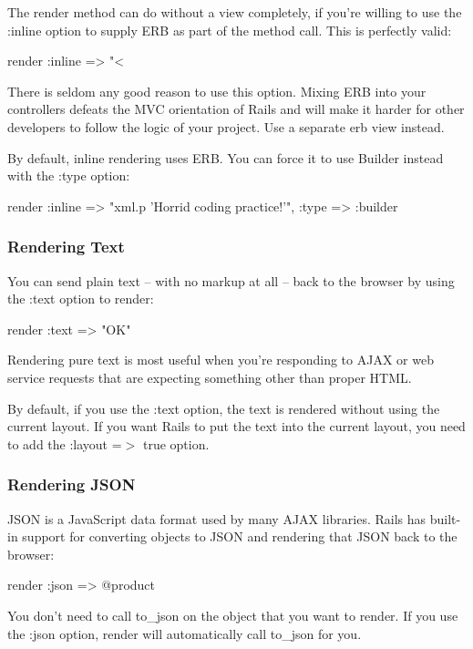 \documentclass[10pt]{book}
\newenvironment{code}{%
  \scriptsize
    \verbatim
}{%
    \endverbatim
    \newline
}
\begin{document}
The render method can do without a view completely, if you’re willing to use the :inline option to supply ERB as part of the method call. This is perfectly valid:
\begin{code}
render :inline =>
  "<%
\end{code}

There is seldom any good reason to use this option. Mixing ERB into your controllers defeats the MVC  orientation of Rails and will make it harder for other developers to  follow the logic of your project. Use a separate erb view instead.

By default, inline rendering uses ERB. You can force it to use Builder instead with the :type option:
\begin{code}
render :inline =>
  "xml.p {'Horrid coding practice!'}", :type => :builder
\end{code}

\subsubsection{ Rendering Text}

You can send plain text – with no markup at all – back to the browser by using the :text option to render:
\begin{code}
render :text => "OK"
\end{code}

Rendering pure text is most useful when you’re responding to AJAX or web service requests that are expecting something other than proper HTML.

By default, if you use the :text option,  the text is rendered without using the current layout. If you want Rails  to put the text into the current layout, you need to add the :layout =$>$ true option.

\subsubsection{ Rendering JSON}

JSON is a JavaScript data format used by many AJAX libraries. Rails has built-in support for converting objects to JSON and rendering that JSON back to the browser:
\begin{code}
render :json => @product
\end{code}

You don’t need to call to\_json on the object that you want to render. If you use the :json option, render will automatically call to\_json for you.
\end{document}
